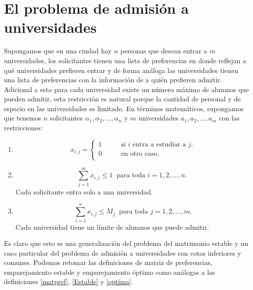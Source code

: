 \chapter{El problema de admisión a universidades}
Supongamos que en una ciudad hay $n$ personas que desean entrar a $m$ universidades, los solicitantes tienen una lista de preferencias en donde reflejan a qué universidades prefieren entrar y de forma análoga las universidades tienen una lista de preferencias con la información de a quién prefieren admitir. Adicional a esto para cada universidad existe un número máximo de alumnos que pueden admitir, esta restricción es natural porque la cantidad de personal y de espacio en las universidades es limitado. 
En términos matemáticos, supongamos que tenemos $n$ solicitantes $\alpha_1,\alpha_2,\ldots,\alpha_n$ y $m$ universidades $a_1, a_2,\ldots,a_m$ con las restricciones:
\begin{enumerate}
\item \begin{equation} \label{2r1}
x_{i,j}= 
\begin{cases}
1 & \qquad \text{si $i$ entra a estudiar a $j$.} \\
0 &\qquad\text{en otro caso.}\ \\ 
\end{cases} \end{equation}
\item \begin{equation} \label{2r2}
\sum_{j=1}^{m}x_{i,j} \leq1 \ \text{ para toda $i=1,2,\ldots,n$. }
\end{equation} Cada solicitante entra solo a una universidad. 
\item \begin{equation} \label{2r3}
\sum_{i=1}^{n} x_{i,j} \leq M_j\ \text{ para toda $j=1,2,\dots,m$.} 
\end{equation}
Cada universidad tiene un límite de alumnos que puede admitir. 

\end{enumerate}

Es claro que esto es una generalización del problema del matrimonio estable y un caso particular del problema de admisión a universidades con cotas inferiores y comunes. Podemos retomar las definiciones de matriz de preferencias, emparejamiento estable y  emparejamiento óptimo como análogas a las definiciones \ref{matpref}, \ref{Estable} y \ref{optima}.

